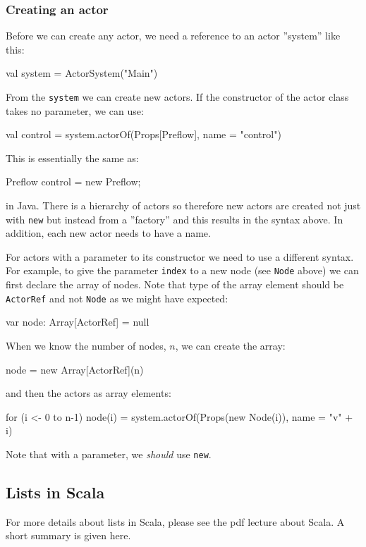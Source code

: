 \documentclass{forsete}
\begin{document}
{\subsubsection*{Creating an actor}
Before we can create any actor, we need a reference to an actor ''system'' like this:
\begin{ccode}
	val system = ActorSystem("Main")
\end{ccode}
From the \verb.system. we can create new actors. If the constructor of the actor class
takes no parameter, we can use:
\begin{ccode}
val control = system.actorOf(Props[Preflow], name = "control")
\end{ccode}
This is essentially the same as:
\begin{ccode}
Preflow control = new Preflow;
\end{ccode}
in Java. There is a hierarchy of actors so therefore new actors are created not just with \verb.new.
but instead from a ''factory'' and this results in the syntax above. In addition, each new actor needs
to have a name.

For actors with a parameter to its constructor we need to use a different syntax.
For example, to give the parameter \verb.index. to a new node (see \verb.Node. above) we
can first declare the array of nodes. Note that type of the array element should be \verb.ActorRef.
and not \verb.Node. as we might have expected:
\begin{ccode}
var	node: Array[ActorRef] = null
\end{ccode}

\noindent When we know the number of nodes, $n$, we can create the array:
\begin{ccode}
node = new Array[ActorRef](n)
\end{ccode}

\noindent and then the actors as array elements:

\begin{ccode}
for (i <- 0 to n-1)
	node(i) = system.actorOf(Props(new Node(i)), name = "v" + i)
\end{ccode}
Note that with a parameter, we {\em should} use \verb.new..

\subsection*{Lists in Scala}
For more details about lists in Scala, please see the pdf lecture about Scala.
A short summary is given here.

}
\end{document}
